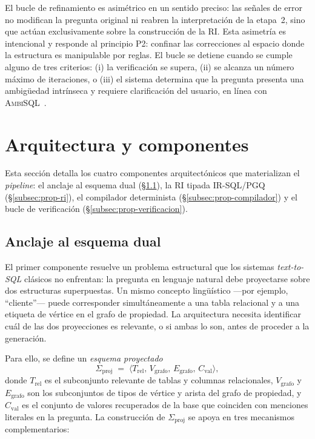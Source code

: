 El bucle de refinamiento es asimétrico en un sentido preciso: las señales de error no modifican la pregunta original ni reabren la interpretación de la etapa~2, sino que actúan exclusivamente sobre la construcción de la \ac{RI}. Esta asimetría es intencional y responde al principio P2: confinar las correcciones al espacio donde la estructura es manipulable por reglas. El bucle se detiene cuando se cumple alguno de tres criterios: (i) la verificación se supera, (ii) se alcanza un número máximo de iteraciones, o (iii) el sistema determina que la pregunta presenta una ambigüedad intrínseca y requiere clarificación del usuario, en línea con \textsc{AmbiSQL}~\cite{AmbiSQL}.

\section{Arquitectura y componentes}
\label{sec:prop-arquitectura}

Esta sección detalla los cuatro componentes arquitectónicos que materializan el \emph{pipeline}: el anclaje al esquema dual (\S\ref{subsec:prop-anclaje}), la \ac{RI} tipada IR-SQL/PGQ (\S\ref{subsec:prop-ri}), el compilador determinista (\S\ref{subsec:prop-compilador}) y el bucle de verificación (\S\ref{subsec:prop-verificacion}).

\subsection{Anclaje al esquema dual}
\label{subsec:prop-anclaje}

El primer componente resuelve un problema estructural que los sistemas \emph{text-to-SQL} clásicos no enfrentan: la pregunta en lenguaje natural debe proyectarse sobre dos estructuras superpuestas. Un mismo concepto lingüístico ---por ejemplo, ``cliente''--- puede corresponder simultáneamente a una tabla relacional y a una etiqueta de vértice en el grafo de propiedad. La arquitectura necesita identificar cuál de las dos proyecciones es relevante, o si ambas lo son, antes de proceder a la generación.

Para ello, se define un \emph{esquema proyectado}
\[
\Sigma_{\mathrm{proj}} \;=\; \langle T_{\mathrm{rel}},\, V_{\mathrm{grafo}},\, E_{\mathrm{grafo}},\, C_{\mathrm{val}} \rangle,
\]
donde $T_{\mathrm{rel}}$ es el subconjunto relevante de tablas y columnas relacionales, $V_{\mathrm{grafo}}$ y $E_{\mathrm{grafo}}$ son los subconjuntos de tipos de vértice y arista del grafo de propiedad, y $C_{\mathrm{val}}$ es el conjunto de valores recuperados de la base que coinciden con menciones literales en la pregunta. La construcción de $\Sigma_{\mathrm{proj}}$ se apoya en tres mecanismos complementarios:

